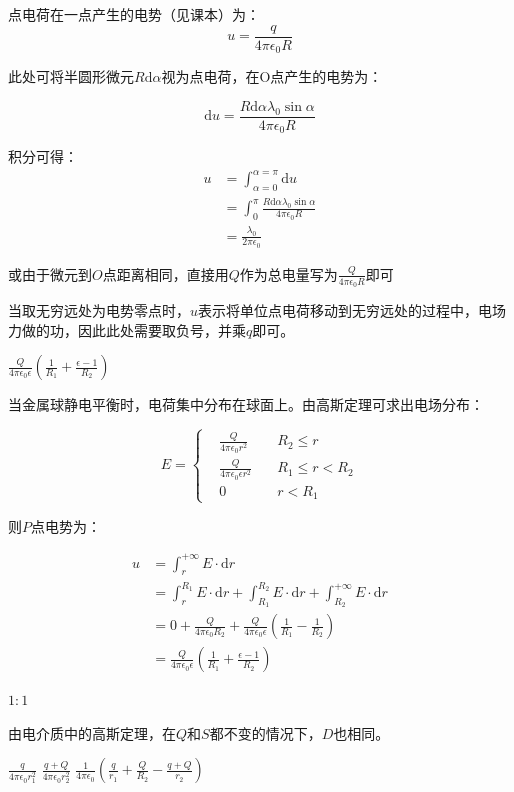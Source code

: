 \documentclass[b5paper,opensource,sourcefont,parskip]{qyxf-book}
\newcommand{\di}[1]{\mathrm{d}#1}
\begin{document}
\solve 点电荷在一点产生的电势（见课本）为：
\[u=\frac{q}{4\pi\epsilon_0 R}\]

此处可将半圆形微元$R\di{\alpha}$视为点电荷，在O点产生的电势为：

\[\di{u}=\frac{R\di{\alpha}\lambda_0\sin\alpha}{4\pi\epsilon_0 R}\]

积分可得：
\begin{align*}
u&=\int_{\alpha=0}^{\alpha=\pi} \di{u}\\
&=\int_0^{\pi} \frac{R\di{\alpha}\lambda_0\sin\alpha}{4\pi\epsilon_0 R}\\
&=\frac{\lambda_0}{2\pi\epsilon_0}
\end{align*}

或由于微元到$O$点距离相同，直接用$Q$作为总电量写为$\frac{Q}{4\pi\epsilon_0 R}$即可

当取无穷远处为电势零点时，$ u $表示将单位点电荷移动到无穷远处的过程中，电场力做的功，因此此处需要取负号，并乘$q$即可。

 $\frac{Q}{4\pi\epsilon_0\epsilon}\left(\frac{1}{R_1}+\frac{\epsilon-1}{R_2}\right)$

\solve 当金属球静电平衡时，电荷集中分布在球面上。由高斯定理可求出电场分布：

\begin{equation}
E=\left\{
\begin{aligned}
&\frac{Q}{4\pi\epsilon_0 r^2}\quad &R_2\leqslant r\\
&\frac{Q}{4\pi\epsilon_0\epsilon r^2}\quad &R_1\leqslant r<R_2\\
&0	&r<R_1
\end{aligned}
\right.
\end{equation}

则$ P $点电势为：

\begin{align*}
u&=\int_r^{+\infty}E\cdot\di{r}\\
&=\int_r^{R_1}E\cdot\di{r}+\int_{R_1}^{R_2}E\cdot\di{r}+\int_{R_2}^{+\infty}E\cdot\di{r}\\
&=0+\frac{Q}{4\pi\epsilon_0 R_2}+\frac{Q}{4\pi\epsilon_0\epsilon}\left(\frac{1}{R_1}-\frac{1}{R_2}\right)\\
&=\frac{Q}{4\pi\epsilon_0\epsilon}\left(\frac{1}{R_1}+\frac{\epsilon-1}{R_2}\right)
\end{align*}

 $1:1$

\solve 由电介质中的高斯定理，在$ Q $和$ S $都不变的情况下，$ D $也相同。

 $\frac{q}{4\pi \epsilon_0 r_1^2}$ \quad $\frac{q+Q}{4\pi\epsilon_0 r_2^2}$ \quad $\frac{1}{4\pi\epsilon_0}\left(\frac{q}{r_1}+\frac{Q}{R_2}-\frac{q+Q}{r_2}\right)$
\end{document}
